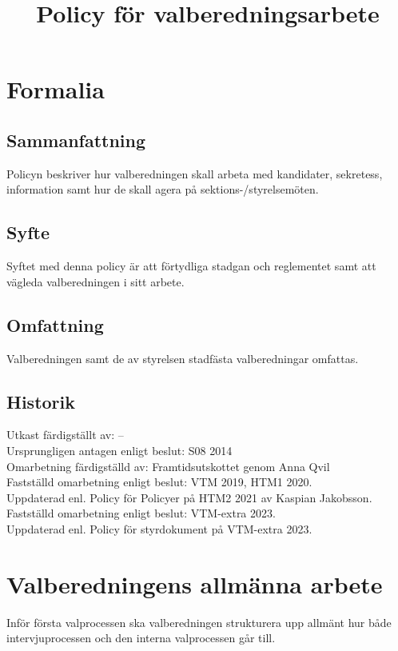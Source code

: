 \documentclass{dsekprotokoll}
\title{Policy för valberedningsarbete}
\author{}
\begin{document}
\maketitle

\section{Formalia}
\subsection{Sammanfattning}
Policyn beskriver hur valberedningen skall arbeta med kandidater, sekretess, information samt
hur de skall agera på sektions-/styrelsemöten.

\subsection{Syfte}
Syftet med denna policy är att förtydliga stadgan och reglementet samt att vägleda valberedningen i sitt arbete.

\subsection{Omfattning}
Valberedningen samt de av styrelsen stadfästa valberedningar omfattas.

\subsection{Historik}
Utkast färdigställt av: – \\
Ursprungligen antagen enligt beslut: S08 2014\\
Omarbetning färdigställd av: Framtidsutskottet genom Anna Qvil\\
Fastställd omarbetning enligt beslut: VTM 2019, HTM1 2020. \\
Uppdaterad enl. Policy för Policyer på HTM2 2021 av Kaspian Jakobsson.\\
Fastställd omarbetning enligt beslut: VTM-extra 2023.\\
Uppdaterad enl. Policy för styrdokument på VTM-extra 2023.


\section{Valberedningens allmänna arbete}

Inför första valprocessen ska valberedningen strukturera upp allmänt hur både intervjuprocessen och den
interna valprocessen går till.
\end{document}
